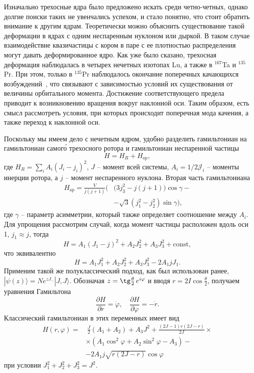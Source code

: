 \documentclass[a4paper, 10pt, twocolumn]{article}
\let\phi\varphi
\begin{document}
\def\Pr#1{$^{135}$Pr}

Изначально трехосные ядра было предложено искать среди четно-четных, 
однако долгие поиски таких не увенчались успехом, и стало понятно, что 
стоит обратить внимание к другим ядрам. Теоретически можно объяснить 
существование такой деформации в ядрах с одним неспаренным нуклоном или 
дыркой. В таком случае взаимодействие квазичастицы с кором в паре 
с ее плотностью распределения могут давать деформированное ядро. Как уже 
было сказано, трехосная деформация наблюдалась в четырех нечетных 
изотопах Lu, а также в $^{167}$Ta и $^{135}$Pr. При этом, только в \Pr{} 
наблюдалось окончание поперечных качающихся возбуждений~\cite{Pr1,Pr2}, 
что связывают с зависимостью условий их существования от величины 
орбитального момента. Достижение соответствующего предела приводит 
к возникновению вращения вокруг наклонной оси. Таким образом, есть смысл 
рассмотреть условия, при которых происходит поперечная мода качения, 
а также переход к наклонной оси.

Поскольку мы имеем дело с нечетным ядром, удобно разделить гамильтониан 
на гамильтониан самог\'{о} трехосного ротора и гамильтониан неспаренной 
частицы
$$ H = H_R + H_\mathrm{sp}, $$
где $H_R = \sum_i A_i (J_i - j_i)^2$, $J$ -- момент всей системы, $A_i 
= 1/2\mathcal{J}_i$ -- моменты инерции ротора, а $j$ -- момент 
неспаренного нуклона. Вторая часть гамильтониана
$$\begin{aligned}
	H_\mathrm{sp} = \frac{V}{j(j+1)} \Big(&\big(3j_3^2 - j(j+1)\big) \cos \gamma - \\
	& - \sqrt{3} (j_1^2 - j_2^2) \sin \gamma \Big),
\end{aligned}$$
где $\gamma$ -- параметр асимметрии, который также определяет 
соотношение между $A_i$. Для упрощения рассмотрим случай, когда момент 
частицы расположен вдоль оси 1, $j_1 \approx j$, тогда
$$ H = A_1 (J_1 - j)^2 + A_2 J_2^2 + A_3 J_3^2 + \mathrm{const}, $$
что эквивалентно
$$ H = A_1 J_1^2 + A_2 J_2^2 + A_3 J_3^2 - 2 A_1 j J_1. $$
Применим такой же полуклассический подход, как был использован ранее, 
$|\psi(z)\rangle = N e^{zJ_-}|J, J\rangle$. Обозначая $z 
= \tg\frac{\theta}{2} \, e^{i\phi}$ и вводя $r = 2I \cos 
\frac{\theta}{2}$, получаем уравнения Гамильтона
$$ \frac{\partial H}{\partial r} = \dot \phi, \quad
   \frac{\partial H}{\partial \phi} = - \dot r. $$
Классический гамильтониан в этих переменных имеет вид
$$\begin{aligned}
	H(r, \phi) =&\ \frac{J}{2} (A_1 + A_2) + A_3 J^2 + \frac{(2J \!-\! 1) r (2J \!-\! r)}{2J}\!\times \\
	& \times (A_1 \cos^2\phi + A_2\sin^2\phi - A_3) - \\
	& - 2 A_1 j \sqrt{r(2J - r)} \cos\phi
\end{aligned}$$
при условии $J_1^2 + J_2^2 + J_3^2 = J^2$.
\end{document}
